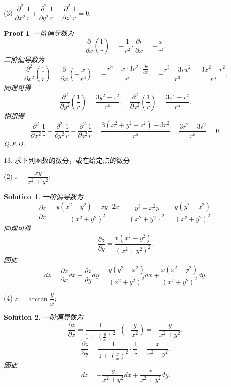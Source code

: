 \documentclass[a4paper,12pt]{article}
\newtheorem*{pf}{Proof}
\newtheorem*{sol}{Solution}
\begin{document}
(3) $\dfrac{\partial^2}{\partial x^2}\dfrac{1}{r} + \dfrac{\partial^2}{\partial y^2}\dfrac{1}{r} + \dfrac{\partial^2}{\partial z^2}\dfrac{1}{r} = 0$.
\begin{pf}
    一阶偏导数为
    $$
        \frac{\partial}{\partial x}\left(\frac{1}{r}\right) = -\frac{1}{r^2}\cdot\frac{\partial r}{\partial x} = -\frac{x}{r^3}.
    $$
    二阶偏导数为
    $$
        \frac{\partial^2}{\partial x^2}\left(\frac{1}{r}\right) = \frac{\partial}{\partial x}\left(-\frac{x}{r^3}\right) = -\frac{r^3 - x\cdot 3r^2\cdot\frac{\partial r}{\partial x}}{r^6} = -\frac{r^3 - 3rx^2}{r^6} = \frac{3x^2 - r^2}{r^5}.
    $$
    同理可得
    $$
        \frac{\partial^2}{\partial y^2}\left(\frac{1}{r}\right) = \frac{3y^2 - r^2}{r^5}, \quad \frac{\partial^2}{\partial z^2}\left(\frac{1}{r}\right) = \frac{3z^2 - r^2}{r^5}.
    $$
    相加得
    $$
        \frac{\partial^2}{\partial x^2}\frac{1}{r} + \frac{\partial^2}{\partial y^2}\frac{1}{r} + \frac{\partial^2}{\partial z^2}\frac{1}{r} = \frac{3(x^2+y^2+z^2) - 3r^2}{r^5} = \frac{3r^2 - 3r^2}{r^5} = 0.
    $$
    Q.E.D.
\end{pf}


13. 求下列函数的微分，或在给定点的微分

(2) $z = \dfrac{xy}{x^2 + y^2}$;
\begin{sol}
    一阶偏导数为
    $$
        \frac{\partial z}{\partial x} = \frac{y(x^2+y^2) - xy\cdot 2x}{(x^2+y^2)^2} = \frac{y^3 - x^2y}{(x^2+y^2)^2} = \frac{y(y^2-x^2)}{(x^2+y^2)^2}.
    $$
    同理可得
    $$
        \frac{\partial z}{\partial y} = \frac{x(x^2-y^2)}{(x^2+y^2)^2}.
    $$
    因此
    $$
        dz = \frac{\partial z}{\partial x}dx + \frac{\partial z}{\partial y}dy = \frac{y(y^2-x^2)}{(x^2+y^2)^2}dx + \frac{x(x^2-y^2)}{(x^2+y^2)^2}dy.
    $$
\end{sol}

(4) $z = \arctan \dfrac{y}{x}$;
\begin{sol}
    一阶偏导数为
    $$
        \frac{\partial z}{\partial x} = \frac{1}{1+\left(\frac{y}{x}\right)^2}\cdot\left(-\frac{y}{x^2}\right) = -\frac{y}{x^2+y^2},
    $$
    $$
        \frac{\partial z}{\partial y} = \frac{1}{1+\left(\frac{y}{x}\right)^2}\cdot\frac{1}{x} = \frac{x}{x^2+y^2}.
    $$
    因此
    $$
        dz = -\frac{y}{x^2+y^2}dx + \frac{x}{x^2+y^2}dy.
    $$
\end{sol}
\end{document}
